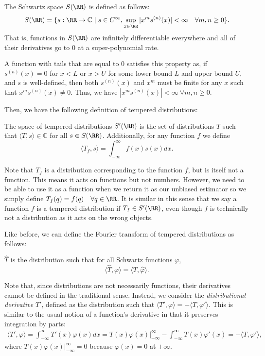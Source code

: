 \documentclass[11pt]{article}
\newcommand{\C}{\mathbb{C}}
\begin{document}
\begin{definition}
    \item The Schwartz space $S(\RR)$ is defined as follows:
    $$S(\RR) = \{s:\RR \rightarrow \C \mid s \in C^\infty, \sup_{x \in \RR} |x^m s^{(n)}(x)| < \infty \quad \forall m,n \ge 0\}.$$
    That is, functions in $S(\RR)$ are infinitely differentiable everywhere and all of their derivatives go to 0 at a super-polynomial rate.
\end{definition}

A function with tails that are equal to 0 satisfies this property as, if $s^{(n)}(x) = 0$ for $x < L$ or $x > U$ for some lower bound $L$ and upper bound $U$, and $s$ is well-defined, then both $s^{(n)}(x)$ and $x^m$ must be finite for any $x$ such that $x^ms^{(n)}(x) \ne 0$. Thus, we have $|x^m s^{(n)}(x)| < \infty \: \forall m,n \ge 0$.

Then, we have the following definition of tempered distributions:

\begin{definition} \label{def:tmprDistAppendix}
    The space of tempered distributions $S'(\RR)$ is the set of distributions $T$ such that $\langle T, s\rangle \in \C$ for all $s \in S(\RR)$. Additionally, for any function $f$ we define
    $$\langle T_f, s\rangle = \int_{-\infty}^\infty f(x) s(x)dx.$$
\end{definition}

Note that $T_f$ is a distribution corresponding to the function $f$, but is itself not a function. This means it acts on functions but not numbers. However, we need to be able to use it as a function when we return it as our unbiased estimator so we simply define $T_f(q) = f(q) \quad \forall q \in \RR$. It is similar in this sense that we say a function $f$ is a tempered distribution if $T_f \in S'(\RR)$, even though $f$ is technically not a distribution as it acts on the wrong objects.

Like before, we can define the Fourier transform of tempered distributions as follows:

\begin{definition} \label{def:DistFourierAppendix}
    $\hat{T}$ is the distribution such that for all Schwartz functions $\varphi$,
    $$\langle \hat{T}, \varphi\rangle = \langle T, \hat{\varphi}\rangle.$$
\end{definition}

Note that, since distributions are not necessarily functions, their derivatives cannot be defined in the traditional sense. Instead, we consider the \textit{distributional derivative} $T'$, defined as the distribution such that $\langle T', \varphi\rangle = -\langle T, \varphi'\rangle$. This is similar to the usual notion of a function's derivative in that it preserves integration by parts:
\begin{align} \label{eq:distDeriv}
    \langle T', \varphi\rangle = \int_{-\infty}^\infty T'(x) \varphi(x) dx = T(x)\varphi(x)|_{-\infty}^\infty - \int_{-\infty}^\infty T(x) \varphi'(x) = -\langle T, \varphi'\rangle,
\end{align}
where $T(x)\varphi(x)|_{-\infty}^\infty = 0$ because $\varphi(x) = 0$ at $\pm \infty$.
\end{document}
